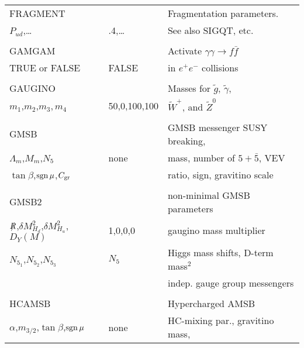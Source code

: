 \newpage
\begin{center}
\begin{tabular}{lll}
\hline\hline
FRAGMENT               &                   & Fragmentation parameters.      \\
$P_{ud}$,\dots         & .4,\dots          & See also SIGQT, etc.           \\
                       &                   &                                \\
GAMGAM                 &             & Activate $\gamma\gamma\to f\bar{f}$  \\
TRUE or FALSE          & FALSE             & in $e^+e^-$ collisions         \\
                       &                   &                                \\
GAUGINO                &                   & Masses for $\tilde g$, 
$\tilde\gamma$,                                                             \\
$m_1$,$m_2$,$m_3,m_4$  & 50,0,100,100      & $\tilde W^+$, and $\tilde Z^0$ \\
                       &                   &                                \\
GMSB                   &                   & GMSB messenger SUSY breaking,  \\
$\Lambda_m$,$M_m$,$N_5$ & none             & mass, number of $5+\bar5$, VEV \\
$\tan\beta$,$\mathop{\rm sgn}\mu$,$C_{\rm gr}$ &       & ratio, sign, gravitino scale   \\
                       &                   &                                \\
GMSB2                  &                   & non-minimal GMSB parameters    \\
$\slashchar{R}$,$\delta M_{H_d}^2$,$\delta M_{H_u}^2$,$D_Y(M)$ & 1,0,0,0 & 
gaugino mass multiplier \\
$N_{5_1}$,$N_{5_2}$,$N_{5_3}$ & $N_5$     & Higgs mass shifts, D-term mass$^2$\\
                       &                   & indep. gauge group messengers  \\
                       &                   &                                \\
HCAMSB                 &                   & Hypercharged AMSB              \\
$\alpha$,$m_{3/2}$,$\tan\beta$,$\mathop{\rm sgn}\mu$ & none & HC-mixing par., gravitino mass, \\

\end{tabular}
\end{center}
